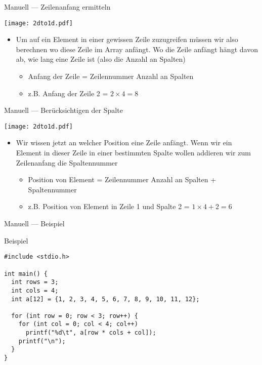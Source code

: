 \documentclass[presentation]{beamer}
\begin{document}
\begin{frame}[label={sec:org6de70e8}]{Manuell --- Zeilenanfang ermitteln}
\begin{center}
\texttt{[image: 2dto1d.pdf]}
\end{center} 
\begin{itemize}
\item Um auf ein Element in einer gewissen Zeile zuzugreifen müssen wir
also berechnen wo diese Zeile im Array anfängt. Wo die Zeile anfängt
hängt davon ab, wie lang eine Zeile ist (also die Anzahl an Spalten)
\begin{itemize}
\item \alert{Anfang der Zeile = Zeilennummer \texttimes{} Anzahl an Spalten}
\item z.B. Anfang der Zeile 2 = \(2 \times 4 = 8\)
\end{itemize}
\end{itemize}
\end{frame}
\begin{frame}[label={sec:orgd0328a3}]{Manuell --- Berücksichtigen der Spalte}
\begin{center}
\texttt{[image: 2dto1d.pdf]}
\end{center} 
\begin{itemize}
\item Wir wissen jetzt an welcher Position eine Zeile anfängt. Wenn wir
ein Element in dieser Zeile in einer bestimmten Spalte wollen
addieren wir zum Zeilenanfang die Spaltennummer
\begin{itemize}
\item \alert{Position von Element = Zeilennummer \texttimes{} Anzahl an Spalten + Spaltennummer}
\item z.B. Position von Element in Zeile 1 und Spalte 2 = \(1 \times 4 + 2 = 6\)
\end{itemize}
\end{itemize}
\end{frame}
\begin{frame}[label={sec:orged8145d},fragile]{Manuell --- Beispiel}
 \begin{block}{Beispiel}
\begin{verbatim}
#include <stdio.h>

int main() {
  int rows = 3;
  int cols = 4;
  int a[12] = {1, 2, 3, 4, 5, 6, 7, 8, 9, 10, 11, 12};

  for (int row = 0; row < 3; row++) {
    for (int col = 0; col < 4; col++)
      printf("%d\t", a[row * cols + col]);
    printf("\n");
  }
}
\end{verbatim}
\end{block}
\end{frame}
\end{document}
